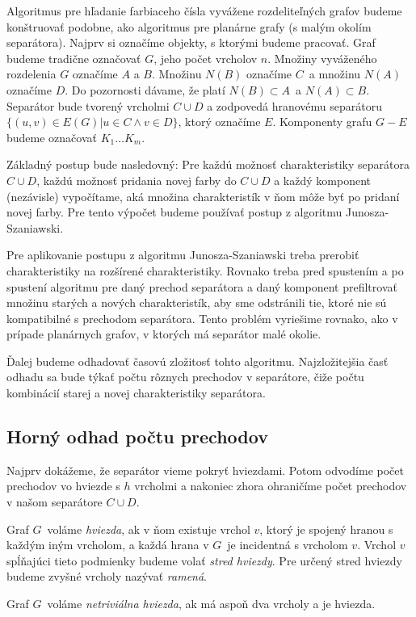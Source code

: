 Algoritmus pre hľadanie farbiaceho čísla vyvážene rozdeliteľných grafov budeme konštruovať podobne, ako
algoritmus pre planárne grafy (s malým okolím separátora). Najprv si označíme objekty, s ktorými budeme
pracovať. Graf budeme tradične označovať $G$, jeho počet vrcholov $n$. Množiny vyváženého rozdelenia $G$
označíme $A$ a $B$. Množinu $N(B)$ označíme $C$ a množinu $N(A)$ označíme $D$. Do pozornosti dávame, že
platí $N(B) \subset A$ a $N(A) \subset B$. Separátor bude tvorený vrcholmi $C \cup D$ a zodpovedá hranovému
separátoru $\{(u,v) \in E(G) | u \in C \wedge v \in D\}$, ktorý označíme $E$. Komponenty grafu $G - E$ budeme
označovať $K_1 \ldots K_m$.

Základný postup bude nasledovný: Pre každú možnosť charakteristiky separátora $C \cup D$,
každú možnosť pridania novej farby do $C \cup D$ a každý komponent (nezávisle) vypočítame, aká
množina charakteristík v ňom môže byť po pridaní novej farby. Pre tento výpočet budeme používať
postup z algoritmu Junosza-Szaniawski.

Pre aplikovanie postupu z algoritmu Junosza-Szaniawski treba prerobiť charakteristiky na
rozšírené charakteristiky. Rovnako treba pred spustením a po spustení algoritmu pre daný
prechod separátora a daný komponent prefiltrovať množinu starých a nových charakteristík,
aby sme odstránili tie, ktoré nie sú kompatibilné s prechodom separátora. Tento problém
vyriešime rovnako, ako v prípade planárnych grafov, v ktorých má separátor malé okolie.

Ďalej budeme odhadovať časovú zložitosť tohto algoritmu. Najzložitejšia časť odhadu sa bude týkať
počtu rôznych prechodov v separátore, čiže počtu kombinácií starej a novej charakteristiky separátora.

\subsection{Horný odhad počtu prechodov}

Najprv dokážeme, že separátor vieme pokryť hviezdami. Potom odvodíme počet prechodov vo hviezde
s $h$ vrcholmi a nakoniec zhora ohraničíme počet prechodov v našom separátore $C \cup D$.

\begin{defn}
    Graf $G$ voláme \emph{hviezda}, ak v ňom existuje vrchol $v$, ktorý je spojený hranou s každým iným
    vrcholom, a každá hrana v $G$ je incidentná s vrcholom $v$. Vrchol $v$ spĺňajúci tieto podmienky
    budeme volať \emph{stred hviezdy}. Pre určený stred hviezdy budeme zvyšné vrcholy nazývať \emph{ramená}.

    Graf $G$ voláme \emph{netriviálna hviezda}, ak má aspoň dva vrcholy a je hviezda.
\end{defn}


